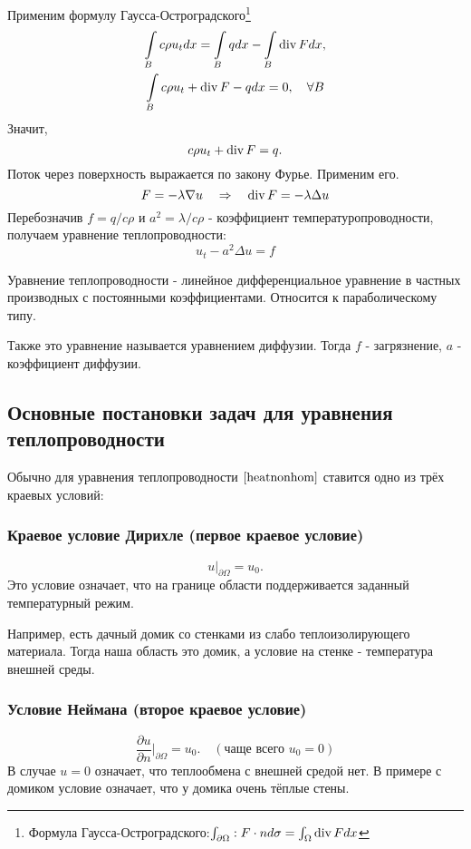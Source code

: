 Применим формулу Гаусса-Остроградского\footnote{Формула Гаусса-Остроградского:$
    \int_{\partial \Omega}: F \cdot n d\sigma = \int_{\Omega} \operatorname{div} F dx$}
\begin{gather*}
    \int \limits_B c \rho u_t dx = \int \limits_B q dx - \int \limits_B \operatorname{div} F dx, \\
    \int \limits_B c \rho u_t + \operatorname{div} F - q dx = 0,\quad \forall B
\end{gather*}
Значит,
$$ c \rho u_t + \operatorname{div} F = q.$$
Поток через поверхность выражается по закону Фурье. Применим его.
$$ F = - \lambda \nabla u \quad \Rightarrow \quad \operatorname{div} F = - \lambda \Delta u$$
Перебозначив $f = q/c\rho$ и $ a^2 = \lambda / c \rho $ - коэффициент температуропроводности, получаем уравнение теплопроводности:
\begin{equation}
	u_t - a^2 \Delta u = f
\label{heatnonhom}
\end{equation}

Уравнение теплопроводности - линейное дифференциальное уравнение в частных производных с постоянными коэффициентами. Относится к параболическому типу.

Также это уравнение называется уравнением диффузии. Тогда $f$ - загрязнение, $a$ - коэффициент диффузии.

\subsection{Основные постановки задач для уравнения теплопроводности}
Обычно для уравнения теплопроводности $\eqref{heatnonhom}$ ставится одно из трёх краевых условий:

\subsubsection{Краевое условие Дирихле (первое краевое условие)}
$$u \Bigg \rvert_{\partial\Omega} = u_0.$$
Это условие означает, что на границе области поддерживается заданный температурный режим.

Например, есть дачный домик со стенками из слабо теплоизолирующего материала. Тогда наша область это домик, а условие на стенке - температура внешней среды.

\subsubsection{Условие Неймана (второе краевое условие)}
$$\dfrac{\partial u}{\partial n}\Bigg\rvert_{\partial\Omega} = u_0.\quad (\text{чаще всего }u_0 = 0)$$
В случае $u = 0$ означает, что теплообмена с внешней средой нет. В примере с домиком условие означает, что у домика очень тёплые стены.

